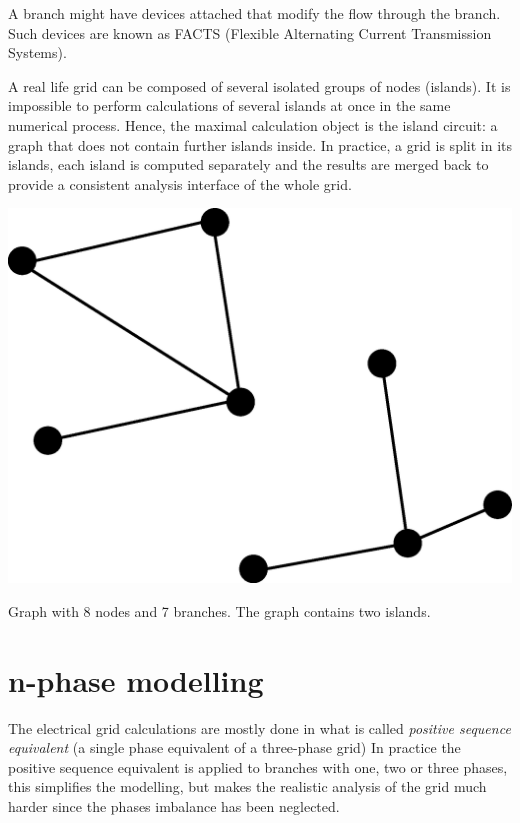 \documentclass[a4paper,twoside]{tufte-book}
\begin{document}
A branch might have devices attached that modify the flow through the branch. Such devices are known as FACTS (Flexible Alternating Current Transmission Systems). 

A real life grid can be composed of several isolated groups of nodes (islands). It is impossible to perform calculations of several islands at once in the same numerical process. Hence, the maximal calculation object is the island circuit: a graph that does not contain further islands inside. In practice, a grid is split in its islands, each island is computed separately and the results are merged back to provide a consistent analysis interface of the whole grid.
\begin{marginfigure}
  \includegraphics[width=\linewidth]{img/simple_two_island_graph.eps}
  \caption{Graph with 8 nodes and 7 branches. The graph contains two islands.}
  \label{fig:simple_two_island_graph}
\end{marginfigure}



\section{n-phase modelling}

The electrical grid calculations are mostly done in what is called \textit{positive sequence equivalent} (a single phase equivalent of a three-phase grid) In practice the positive sequence equivalent is applied to branches with one, two or three phases, this simplifies the modelling, but makes the realistic analysis of the grid much harder since the phases imbalance has been neglected.
\end{document}
